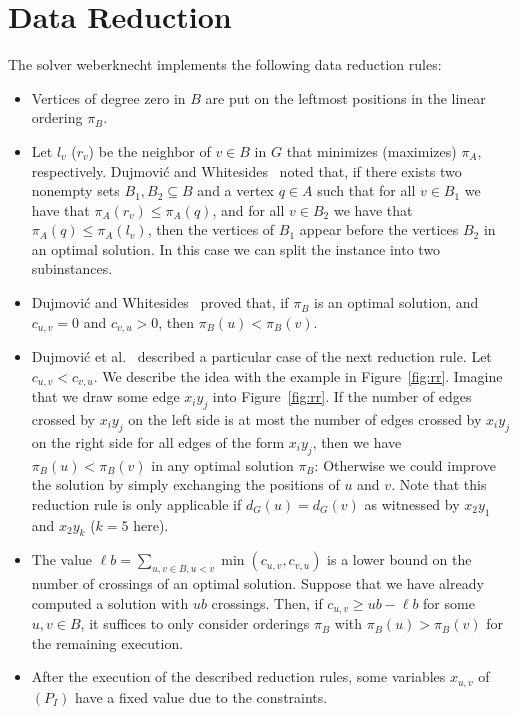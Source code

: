 \documentclass[a4paper,UKenglish,cleveref, autoref, thm-restate]{lipics-v2021}
\begin{document}
\section{Data Reduction}\label{sec:red}
The solver \textsf{weberknecht} implements the following data reduction rules:
\begin{itemize}
\item Vertices of degree zero in $B$ are put on the leftmost positions in the linear ordering $\pi_B$.
\item Let $l_v$ ($r_v$) be the neighbor of $v \in B$ in $G$ that minimizes (maximizes) $\pi_A$, respectively.
Dujmovi\'c and Whitesides~\cite{dujmovic2004efficient} noted that, if there exists two nonempty sets $B_1, B_2 \subseteq B$ and a vertex $q \in A$ such that for all $v \in B_1$ we have that $\pi_A(r_v) \leq \pi_A(q)$, and for all $v \in B_2$ we have that $\pi_A(q) \leq \pi_A(l_v)$,
then the vertices of $B_1$ appear before the vertices $B_2$ in an optimal solution.
In this case we can split the instance into two subinstances.
\item Dujmovi\'c and Whitesides~\cite{dujmovic2004efficient} proved that, 
if $\pi_B$ is an optimal solution, and $c_{u, v} = 0$ and $c_{v, u} > 0$,
then $\pi_B(u) < \pi_B(v)$.
\item Dujmovi\'{c} et al.~\cite{dujmovic2008fixed} described a particular case of the next reduction rule.
Let $c_{u, v} < c_{v, u}$. 
We describe the idea with the example in Figure~\ref{fig:rr}.
Imagine that we draw some edge $x_iy_j$ into Figure~\ref{fig:rr}.
If the number of edges crossed by $x_iy_j$ on the left side is at most the number of edges crossed by $x_iy_j$ on the right side for all edges of the form $x_iy_j$, then we have $\pi_B(u) < \pi_B(v)$ in any optimal solution $\pi_B$:
Otherwise we could improve the solution by simply exchanging the positions of $u$ and $v$.
Note that this reduction rule is only applicable if $d_G(u) = d_G(v)$ as witnessed by $x_2y_1$ and $x_2y_k$ ($k=5$ here).
\item The value $\ell b = \sum_{u, v \in B, u < v} \min(c_{u,v}, c_{v,u})$ is a lower bound on the number of crossings of an optimal solution.
Suppose that we have already computed a solution with $ub$ crossings.
Then, if $c_{u,v} \geq ub - \ell b$ for some $u, v \in B$, it suffices to only consider orderings $\pi_B$ with $\pi_B(u) > \pi_B(v)$ for the remaining execution.
\item After the execution of the described reduction rules, some variables $x_{u,v}$ of $(P_I)$ have a fixed value due to the constraints.
\end{itemize}
\end{document}
